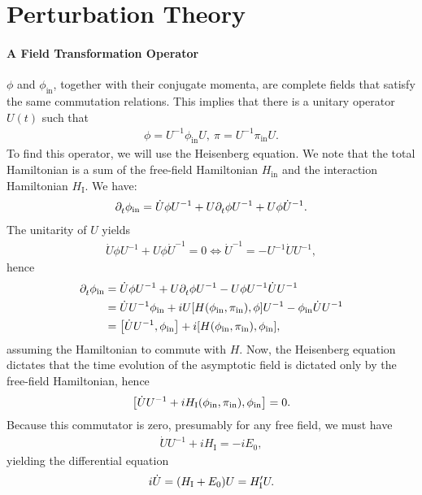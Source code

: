 \section{Perturbation Theory}

\paragraph{A Field Transformation Operator}
$\phi$ and $\phi_{\text{in}}$, together with their conjugate momenta, are complete fields that satisfy the same commutation relations. This implies that there is a unitary operator $U(t)$ such that
\begin{align*}
	\phi = U^{-1}\phi_{\text{in}}U,\ \pi = U^{-1}\pi_{\text{in}}U.
\end{align*}
To find this operator, we will use the Heisenberg equation. We note that the total Hamiltonian is a sum of the free-field Hamiltonian $H_{\text{in}}$ and the interaction Hamiltonian $H_{\text{I}}$. We have:
\begin{align*}
	\partial^{}_{t}\phi_{\text{in}} = \dot{U}\phi U^{-1} + U\partial^{}_{t}\phi U^{-1} + U\phi \dot{U}^{-1}.
\end{align*}
The unitarity of $U$ yields
\begin{align*}
	\dot{U}\phi U^{-1} + U\phi\dot{U}^{-1} = 0 \iff \dot{U}^{-1} = -U^{-1}\dot{U}U^{-1},
\end{align*}
hence
\begin{align*}
	\del{}{t}\phi_{\text{in}} &= \dot{U}\phi U^{-1} + U\del{}{t}\phi U^{-1} - U\phi U^{-1}\dot{U}U^{-1} \\
	                          &= \dot{U}U^{-1}\phi_{\text{in}} + iU\comm{H(\phi_{\text{in}}, \pi_{\text{in}})}{\phi} U^{-1} - \phi_{\text{in}}\dot{U}U^{-1} \\
	                          &= \comm{\dot{U}U^{-1}}{\phi_{\text{in}}} + i\comm{H(\phi_{\text{in}}, \pi_{\text{in}})}{\phi_{\text{in}}},
\end{align*}
assuming the Hamiltonian to commute with $H$. Now, the Heisenberg equation dictates that the time evolution of the asymptotic field is dictated only by the free-field Hamiltonian, hence
\begin{align*}
	\comm{\dot{U}U^{-1} + iH_{\text{I}}(\phi_{\text{in}}, \pi_{\text{in}})}{\phi_{\text{in}}} = 0.
\end{align*}
Because this commutator is zero, presumably for any free field, we must have
\begin{align*}
	\dot{U}U^{-1} + iH_{\text{I}} = -iE_{0},
\end{align*}
yielding the differential equation
\begin{align*}
	i\dot{U} = (H_{\text{I}} + E_{0})U = H_{\text{I}}^{\prime} U.
\end{align*}

